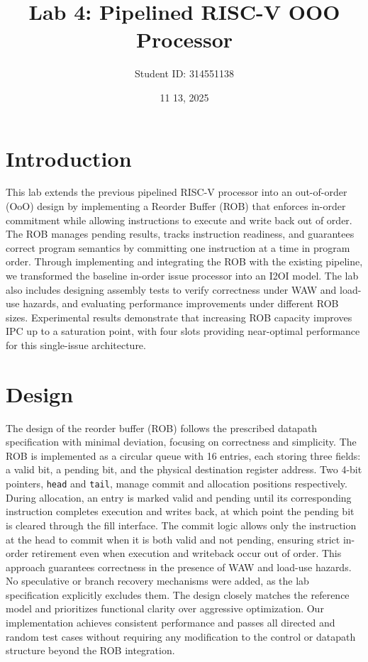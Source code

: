 \documentclass[11pt,a4paper]{article}
\begin{document}
\title{Lab 4: Pipelined RISC-V OOO Processor}
\author{Student ID: 314551138}
\date{11 13, 2025}
\maketitle

\section{Introduction}
This lab extends the previous pipelined RISC-V processor into an out-of-order (OoO) design by implementing a Reorder Buffer (ROB) that enforces in-order commitment while allowing instructions to execute and write back out of order. The ROB manages pending results, tracks instruction readiness, and guarantees correct program semantics by committing one instruction at a time in program order. Through implementing and integrating the ROB with the existing pipeline, we transformed the baseline in-order issue processor into an I2OI model. The lab also includes designing assembly tests to verify correctness under WAW and load-use hazards, and evaluating performance improvements under different ROB sizes. Experimental results demonstrate that increasing ROB capacity improves IPC up to a saturation point, with four slots providing near-optimal performance for this single-issue architecture.

\section{Design}


The design of the reorder buffer (ROB) follows the prescribed datapath specification with minimal deviation, focusing on correctness and simplicity. The ROB is implemented as a circular queue with 16 entries, each storing three fields: a valid bit, a pending bit, and the physical destination register address. Two 4-bit pointers, \texttt{head} and \texttt{tail}, manage commit and allocation positions respectively. During allocation, an entry is marked valid and pending until its corresponding instruction completes execution and writes back, at which point the pending bit is cleared through the fill interface. The commit logic allows only the instruction at the head to commit when it is both valid and not pending, ensuring strict in-order retirement even when execution and writeback occur out of order. This approach guarantees correctness in the presence of WAW and load-use hazards. No speculative or branch recovery mechanisms were added, as the lab specification explicitly excludes them. The design closely matches the reference model and prioritizes functional clarity over aggressive optimization. Our implementation achieves consistent performance and passes all directed and random test cases without requiring any modification to the control or datapath structure beyond the ROB integration.
\end{document}
